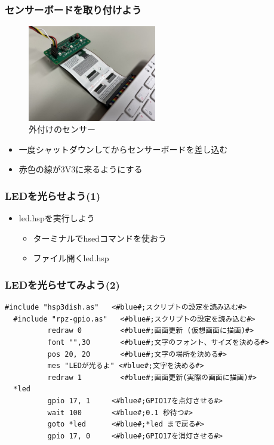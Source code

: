 \begin{frame}
  \frametitle{センサーボードを取り付けよう}
  \begin{figure}
    \centering

    \includegraphics[width=0.5\textwidth]{../images/chap03/how_to_install_bme280.jpg}
    \caption{外付けのセンサー}
  \end{figure}
  \begin{itemize}
    \item 一度シャットダウンしてからセンサーボードを差し込む
    \item 赤色の線が3V3に来るようにする
  \end{itemize}
\end{frame}

\begin{frame}
  \frametitle{LEDを光らせよう(1)}
  \begin{itemize}
    \item led.hspを実行しよう
    \begin{itemize}
      \item ターミナルでhsedコマンドを使おう
      \item ファイル\rightarrow 開く\rightarrow led.hsp
    \end{itemize}
  \end{itemize}
\end{frame}

\begin{frame}[fragile]
  \frametitle{LEDを光らせてみよう(2)}
  \begin{lstlisting}[title=led.hsp,label=led.hsp]
  #include "hsp3dish.as"   <#blue#;スクリプトの設定を読み込む#>
  #include "rpz-gpio.as"   <#blue#;スクリプトの設定を読み込む#>
          redraw 0         <#blue#;画面更新 (仮想画面に描画)#>
          font "",30       <#blue#;文字のフォント、サイズを決める#>
          pos 20, 20       <#blue#;文字の場所を決める#>
          mes "LEDが光るよ" <#blue#;文字を決める#>
          redraw 1         <#blue#;画面更新(実際の画面に描画)#>
  *led
          gpio 17, 1     <#blue#;GPIO17を点灯させる#>
          wait 100       <#blue#;0.1 秒待つ#>
          goto *led      <#blue#;*led まで戻る#>
          gpio 17, 0     <#blue#;GPIO17を消灯させる#>
  \end{lstlisting}
\end{frame}

